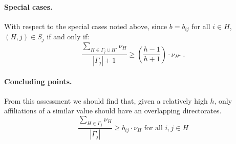 \documentclass[11pt,fleqn]{article}
\begin{document}
\paragraph{Special cases.}

With respect to the special cases noted above, since $b = b_{ij}$ for all $i \in H$, $(H,j) \in S_{j}$ if and only if:
\begin{equation}
\frac{\sum_{H \in \Gamma_{j} \cup H'} \nu_{H}}{| \Gamma_{j} | + 1} \geqslant \left( \frac{h - 1}{h + 1} \right) \cdot \nu_{H^{\star}} ~ .
\end{equation}

\paragraph{Concluding points.}

From this assessment we should find that, given a relatively high $h$, only affiliations of a similar value should have an overlapping directorates.
\begin{equation}
\frac{\sum_{H \in \Gamma_{j}} \nu_{H}}{| \Gamma_{j} |} \geqslant b_{ij} \cdot \nu_{H} \mbox{ for all } i,j \in H
\end{equation}
\end{document}

